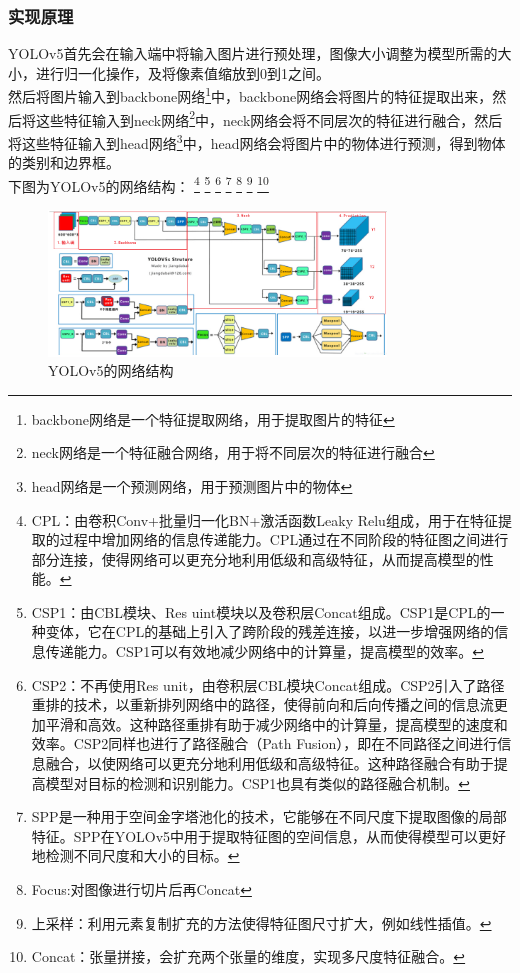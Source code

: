 \documentclass{nwputhesis}
\begin{document}
\subsubsection{实现原理}
YOLOv5首先会在输入端中将输入图片进行预处理，图像大小调整为模型所需的大小，进行归一化操作，及将像素值缩放到0到1之间。\\
\indent 然后将图片输入到backbone网络\footnote{backbone网络是一个特征提取网络，用于提取图片的特征}中，backbone网络会将图片的特征提取出来，然后将这些特征输入到neck网络\footnote{neck网络是一个特征融合网络，用于将不同层次的特征进行融合}中，neck网络会将不同层次的特征进行融合，然后将这些特征输入到head网络\footnote{head网络是一个预测网络，用于预测图片中的物体}中，head网络会将图片中的物体进行预测，得到物体的类别和边界框。
\\
\indent 下图为YOLOv5的网络结构：
\footnote{CPL：由卷积Conv+批量归一化BN+激活函数Leaky Relu组成，用于在特征提取的过程中增加网络的信息传递能力。CPL通过在不同阶段的特征图之间进行部分连接，使得网络可以更充分地利用低级和高级特征，从而提高模型的性能。}
\footnote{CSP1：由CBL模块、Res uint模块以及卷积层Concat组成。CSP1是CPL的一种变体，它在CPL的基础上引入了跨阶段的残差连接，以进一步增强网络的信息传递能力。CSP1可以有效地减少网络中的计算量，提高模型的效率。}
\footnote{CSP2：不再使用Res unit，由卷积层CBL模块Concat组成。CSP2引入了路径重排的技术，以重新排列网络中的路径，使得前向和后向传播之间的信息流更加平滑和高效。这种路径重排有助于减少网络中的计算量，提高模型的速度和效率。CSP2同样也进行了路径融合（Path Fusion），即在不同路径之间进行信息融合，以使网络可以更充分地利用低级和高级特征。这种路径融合有助于提高模型对目标的检测和识别能力。CSP1也具有类似的路径融合机制。}
\footnote{SPP是一种用于空间金字塔池化的技术，它能够在不同尺度下提取图像的局部特征。SPP在YOLOv5中用于提取特征图的空间信息，从而使得模型可以更好地检测不同尺度和大小的目标。}
\footnote{Focus:对图像进行切片后再Concat}
\footnote{上采样：利用元素复制扩充的方法使得特征图尺寸扩大，例如线性插值。}
\footnote{Concat：张量拼接，会扩充两个张量的维度，实现多尺度特征融合。}
\begin{figure}[H]
    \centering
    \includegraphics[width=0.8\textwidth]{picture/4.png}
    \caption{YOLOv5的网络结构}
\end{figure}
\makespace
\end{document}
